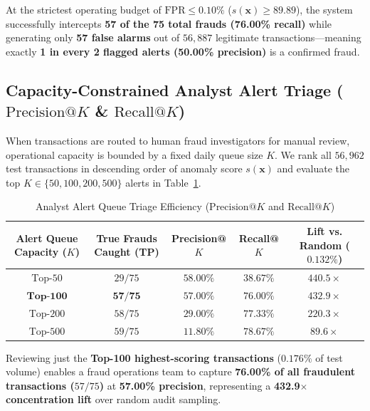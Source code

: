 \documentclass[11pt, a4paper]{article}
\begin{document}
At the strictest operating budget of $\text{FPR} \le 0.10\%$ ($s(\mathbf{x}) \ge 89.89$), the system successfully intercepts \textbf{57 of the 75 total frauds (76.00\% recall)} while generating only \textbf{57 false alarms} out of $56,887$ legitimate transactions—meaning exactly \textbf{1 in every 2 flagged alerts (50.00\% precision)} is a confirmed fraud.

\subsection{Capacity-Constrained Analyst Alert Triage ($\text{Precision@}K$ \& $\text{Recall@}K$)}
When transactions are routed to human fraud investigators for manual review, operational capacity is bounded by a fixed daily queue size $K$. We rank all $56,962$ test transactions in descending order of anomaly score $s(\mathbf{x})$ and evaluate the top $K \in \{50, 100, 200, 500\}$ alerts in Table~\ref{tab:topk}.

\begin{table}[h!]
\centering
\caption{Analyst Alert Queue Triage Efficiency ($\text{Precision@}K$ and $\text{Recall@}K$)}
\vspace{0.2cm}
\renewcommand{\arraystretch}{1.25}
\begin{tabular}{ccccc}
\toprule
\rowcolor{tableheader}
\textbf{Alert Queue Capacity ($K$)} & \textbf{True Frauds Caught (TP)} & \textbf{Precision@$K$} & \textbf{Recall@$K$} & \textbf{Lift vs. Random ($0.132\%$)} \\
\midrule
$\text{Top-}50$ & $29 / 75$ & $\mathbf{58.00\%}$ & $38.67\%$ & $\mathbf{440.5\times}$ \\
\rowcolor{rowalt}
$\mathbf{\text{Top-}100}$ & $\mathbf{57 / 75}$ & $\mathbf{57.00\%}$ & $\mathbf{76.00\%}$ & $\mathbf{432.9\times}$ \\
$\text{Top-}200$ & $58 / 75$ & $29.00\%$ & $77.33\%$ & $220.3\times$ \\
\rowcolor{rowalt}
$\text{Top-}500$ & $59 / 75$ & $11.80\%$ & $78.67\%$ & $89.6\times$ \\
\bottomrule
\end{tabular}
\label{tab:topk}
\end{table}

Reviewing just the \textbf{Top-100 highest-scoring transactions} ($0.176\%$ of test volume) enables a fraud operations team to capture \textbf{76.00\% of all fraudulent transactions ($57 / 75$)} at \textbf{57.00\% precision}, representing a \textbf{432.9$\times$ concentration lift} over random audit sampling.
\end{document}
